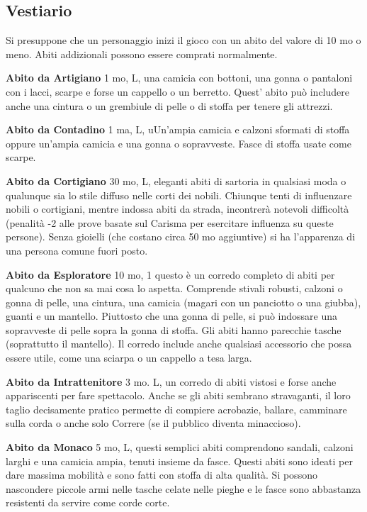 \documentclass[a4paper,11pt,twoside,openany]{book}
\begin{document}
{\pagebreak

\subsection{Vestiario}

\label{vestiario}

Si presuppone che un personaggio inizi il gioco con un abito del valore di 10 mo o meno. Abiti addizionali possono essere comprati normalmente.

\textbf{Abito da Artigiano} 1 mo, L, una camicia con bottoni, una gonna o pantaloni con i lacci, scarpe e forse un cappello o un berretto. Quest' abito può includere anche una cintura o un grembiule di pelle o di stoffa per tenere gli attrezzi.

\textbf{Abito da Contadino} 1 ma, L, uUn'ampia camicia e calzoni sformati di stoffa oppure un'ampia camicia e una gonna o sopravveste. Fasce di stoffa usate come scarpe.

\textbf{Abito da Cortigiano} 30 mo, L, eleganti abiti di sartoria in qualsiasi moda o qualunque sia lo stile diffuso nelle corti dei nobili. Chiunque tenti di influenzare nobili o cortigiani, mentre indossa abiti da strada, incontrerà notevoli difficoltà (penalità -2 alle prove basate sul Carisma per esercitare influenza su queste persone). Senza gioielli (che costano circa 50 mo aggiuntive) si ha l'apparenza di una persona comune fuori posto.

\textbf{Abito da Esploratore} 10 mo, 1 questo è un corredo completo di abiti per qualcuno che non sa mai cosa lo aspetta. Comprende stivali robusti, calzoni o gonna di pelle, una cintura, una camicia (magari con un panciotto o una giubba), guanti e un mantello. 
Piuttosto che una gonna di pelle, si può indossare una sopravveste di pelle sopra la gonna di stoffa. Gli abiti hanno parecchie tasche (soprattutto il mantello). Il corredo include anche qualsiasi accessorio che possa essere utile, come una sciarpa o un cappello a tesa larga.

\textbf{Abito da Intrattenitore} 3 mo. L,  un corredo di abiti vistosi e forse anche appariscenti per fare spettacolo. Anche se gli abiti sembrano stravaganti, il loro taglio decisamente pratico permette di compiere acrobazie, ballare, camminare sulla corda o anche solo Correre (se il pubblico diventa minaccioso).

\textbf{Abito da Monaco} 5 mo, L, questi semplici abiti comprendono sandali, calzoni larghi e una camicia ampia, tenuti insieme da fasce. Questi abiti sono ideati per dare massima mobilità e sono fatti con stoffa di alta qualità. Si possono nascondere piccole armi nelle tasche celate nelle pieghe e le fasce sono abbastanza resistenti da servire come corde corte.

}
\end{document}
